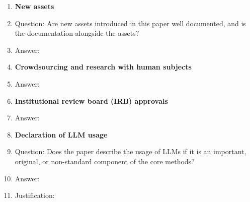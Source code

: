 \begin{enumerate}
\item {\bf New assets}
\item[] Question: Are new assets introduced in this paper well documented, and is the documentation alongside the assets?
\item[] Answer: \todo{[Yes/NA]}

\item {\bf Crowdsourcing and research with human subjects}
\item[] Answer: \todo{[NA]}

\item {\bf Institutional review board (IRB) approvals}
\item[] Answer: \todo{[NA]}

\item {\bf Declaration of LLM usage}
\item[] Question: Does the paper describe the usage of LLMs if it is an important, original, or non-standard component of the core methods?
\item[] Answer: \todo{[Yes/NA]}
\item[] Justification: 

\end{enumerate}
